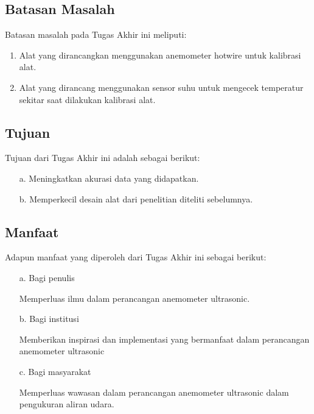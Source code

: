 \subsection{Batasan Masalah}

Batasan masalah pada Tugas Akhir ini meliputi:
\begin{enumerate}
	\item Alat yang dirancangkan menggunakan anemometer hotwire untuk kalibrasi alat.
	\item Alat yang dirancang menggunakan sensor suhu untuk mengecek temperatur sekitar saat dilakukan kalibrasi alat.
\end{enumerate}


\subsection{Tujuan}

Tujuan dari Tugas Akhir ini adalah sebagai berikut:
\begin{enumerate}
	\item[a.]	Meningkatkan akurasi data yang didapatkan.
	\item[b.]	Memperkecil desain alat dari penelitian diteliti sebelumnya.
\end{enumerate}


\subsection{Manfaat}

Adapun manfaat yang diperoleh dari Tugas Akhir ini sebagai berikut:
\begin{enumerate}
	\item [a.]	Bagi penulis 
	
	Memperluas ilmu dalam perancangan anemometer ultrasonic.
	
	\item [b.]	Bagi institusi
	
	 Memberikan inspirasi dan implementasi yang bermanfaat dalam perancangan anemometer ultrasonic
	
	\item [c.]	Bagi masyarakat
	
	Memperluas wawasan dalam perancangan anemometer ultrasonic dalam pengukuran aliran udara.
	
\end{enumerate}

